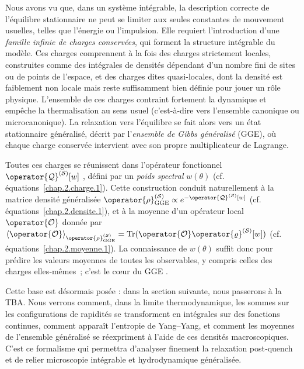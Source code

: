 
Nous avons vu que, dans un système intégrable, la description correcte de l’équilibre stationnaire ne peut se limiter aux seules constantes de mouvement usuelles, telles que l’énergie ou l’impulsion. Elle requiert l’introduction d’une \emph{famille infinie de charges conservées}, qui forment la structure intégrable du modèle. Ces charges comprennent à la fois des charges strictement locales, construites comme des intégrales de densités dépendant d’un nombre fini de sites ou de points de l’espace, et des charges dites quasi-locales, dont la densité est faiblement non locale mais reste suffisamment bien définie pour jouer un rôle physique. L’ensemble de ces charges contraint fortement la dynamique et empêche la thermalisation au sens usuel (c’est-à-dire vers l’ensemble canonique ou microcanonique). La relaxation vers l’équilibre se fait alors vers un état stationnaire généralisé, décrit par l’\emph{ensemble de Gibbs généralisé} (\gls{GGE}), où chaque charge conservée intervient avec son propre multiplicateur de Lagrange.

\medskip

Toutes ces charges se réunissent dans l’opérateur fonctionnel
\(
\operator{\mathcal{Q}}^{(\mathcal{S})}[w]
\)
, défini par un \emph{poids spectral}  $w(\theta)$ (cf. équations~\eqref{chap.2.charge.1}).
Cette construction conduit naturellement à la matrice densité généralisée
\(
\operator{\rho}^{(\mathcal{S})}_{\mathrm{GGE}}  \propto  e^{-\operator{\mathcal{Q}}^{(\mathcal{S})}[w]}
\) 
(cf. équations~\eqref{chap.2.densite.1}), et à la moyenne d’un opérateur local $\operator{\mathcal{O}}$ donnée par
\(
\langle \operator{\mathcal{O}}\rangle_{\operator{\rho}^{(\mathcal{S})}_{\mathrm{GGE}}}  =  \displaystyle  \text{Tr} (\operator{\mathcal{O}}\operator{\varrho}^{(\mathcal{S})}[w])
\)
(cf. équations~\eqref{chap.2.moyenne.1}).
La connaissance de $w(\theta)$ suffit donc pour prédire les valeurs moyennes de toutes les observables, y compris celles des charges elles‑mêmes ; c’est le cœur du \gls{GGE} .

\medskip

Cette base est désormais posée : dans la section suivante, nous passerons à la  \gls{TBA}.
Nous verrons comment, dans la limite thermodynamique, les sommes sur les configurations de rapidités se transforment en intégrales sur des fonctions continues, comment apparaît l’entropie de Yang–Yang, et comment les moyennes de l’ensemble généralisé se réexpriment à l’aide de ces densités macroscopiques.
C’est ce formalisme qui permettra d’analyser finement la relaxation post‑quench et de relier microscopie intégrable et hydrodynamique généralisée.



